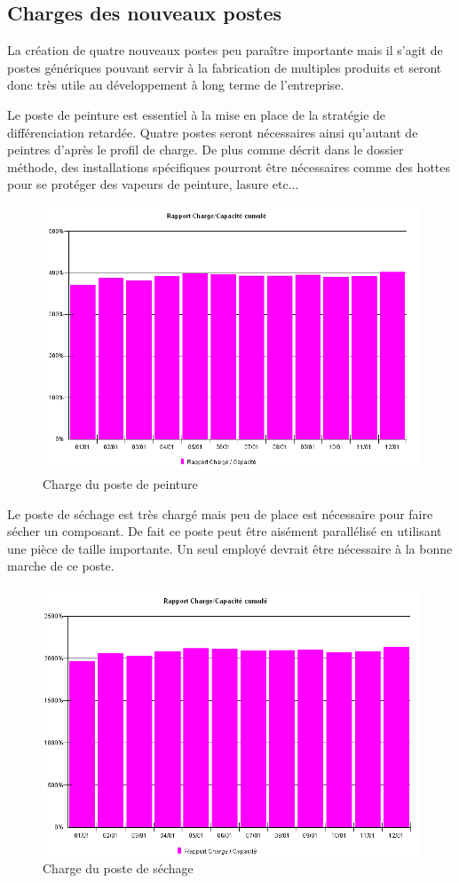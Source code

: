 \documentclass[a4paper]{../TPInsa}
\begin{document}
	\subsection{Charges des nouveaux postes}
	La création de quatre nouveaux postes peu paraître importante mais il s'agit de postes génériques pouvant servir à la fabrication de multiples produits et seront donc très utile au développement à long terme de l'entreprise. 
	
	Le poste de peinture est essentiel à la mise en place de la stratégie de différenciation retardée. Quatre postes seront nécessaires ainsi qu'autant de peintres d'après le profil de charge. De plus comme décrit dans le dossier méthode, des installations spécifiques pourront être nécessaires comme des hottes pour se protéger des vapeurs de peinture, lasure etc...
	\begin{figure}[H]
	\centering
	\includegraphics[scale=0.6]{captures/charge_pein.PNG}
	\caption{Charge du poste de peinture}
	\end{figure}
	
	Le poste de séchage est très chargé mais peu de place est nécessaire pour faire sécher un composant. De fait ce poste peut être aisément parallélisé en utilisant une pièce de taille importante. Un seul employé devrait être nécessaire à la bonne marche de ce poste.
	\begin{figure}[H]
	\centering
	\includegraphics[scale=0.6]{captures/sechage.PNG}
	\caption{Charge du poste de séchage}
	\end{figure}
	
\end{document}
